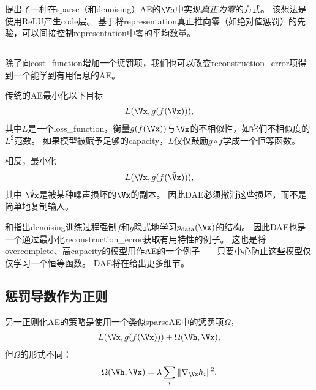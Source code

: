 \citet{Glorot+al-ICML-2011-small}提出了一种在\gls{sparse}（和\gls{denoising}）\gls{AE}的$\Vh$中实现\emph{真正为零}的方式。
该想法是使用\gls{ReLU}产生\gls{code}层。
基于将\gls{representation}真正推向零（如绝对值惩罚）的先验，可以间接控制\gls{representation}中零的平均数量。



\subsection{}
\label{sec:sub_denoising_autoencoders}
除了向\gls{cost_function}增加一个惩罚项，我们也可以改变\gls{reconstruction_error}项得到一个能学到有用信息的\gls{AE}。


传统的\gls{AE}最小化以下目标
\begin{align}
    L(\Vx, g(f(\Vx))),
\end{align}
其中$L$是一个\gls{loss_function}，衡量$g(f(\Vx))$与$\Vx$的不相似性，如它们不相似度的$L^2$范数。
如果模型被赋予足够的\gls{capacity}，$L$仅仅鼓励$g \circ  f$学成一个恒等函数。


相反，最小化 
\begin{align}
    L(\Vx, g(f(\tilde \Vx))),
\end{align}
其中 $\tilde \Vx$是被某种噪声损坏的$\Vx$的副本。
因此\gls{DAE}必须撤消这些损坏，而不是简单地复制输入。

\citet{Alain+Bengio-ICLR2013-small}和\citet{Bengio-et-al-NIPS2013-small}指出\gls{denoising}训练过程强制$f$和$g$隐式地学习$p_{\text{data}} (\Vx)$的结构。
因此\gls{DAE}也是一个通过最小化\gls{reconstruction_error}获取有用特性的例子。
这也是将\gls{overcomplete}、高\gls{capacity}的模型用作\gls{AE}的一个例子——只要小心防止这些模型仅仅学习一个恒等函数。
\gls{DAE}将在给出更多细节。


\subsection{惩罚导数作为正则}
\label{sec:regularizing_by_penalizing_derivatives}
另一正则化\gls{AE}的策略是使用一个类似\gls{sparse}\gls{AE}中的惩罚项$\Omega$，
\begin{align}
    L(\Vx, g(f(\Vx))) + \Omega(\Vh, \Vx),
\end{align}
但$\Omega$的形式不同：
\begin{align}
\Omega(\Vh, \Vx) = \lambda \sum_i \| \nabla_{\Vx}h_i \|^2.
\end{align}


